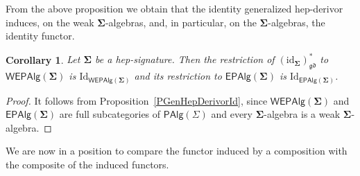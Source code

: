\documentclass[a4paper, reqno]{amsbook}
\newcommand{\sig}[1]{\mathbf{#1}}             %
\newcommand{\gd}{\mathfrak{gd}}              %
\newcommand{\id}{\mathrm{id}}
\newcommand{\Id}{\mathrm{Id}}
\theoremstyle{plain}
\newtheorem{corollary}[theorem]{Corollary}
\theoremstyle{definition}
\begin{document}
From the above proposition we obtain that the identity generalized hep-derivor induces, on the weak $\sig{\Sigma}$-algebras, and, in particular, on the $\sig{\Sigma}$-algebras, the identity functor.

\begin{corollary}\label{CGenHepDerivorIdFunctor}
Let $\sig{\Sigma}$ be a hep-signature.
Then the restriction of $(\id_{\sig{\Sigma}})^{\ast}_{\gd}$ to $\mathsf{WEPAlg}(\sig{\Sigma})$ is $\Id_{\mathsf{WEPAlg}(\sig{\Sigma})}$ and its restriction to $\mathsf{EPAlg}(\sig{\Sigma})$ is $\Id_{\mathsf{EPAlg}(\sig{\Sigma})}$.
\end{corollary}
\begin{proof}
It follows from Proposition~\ref{PGenHepDerivorId}, since $\mathsf{WEPAlg}(\sig{\Sigma})$ and $\mathsf{EPAlg}(\sig{\Sigma})$ are full subcategories of $\mathsf{PAlg}(\Sigma)$ and every $\sig{\Sigma}$-algebra is a weak $\sig{\Sigma}$-algebra.
\end{proof}

We are now in a position to compare the functor induced by a composition with the composite of the induced functors.
\end{document}
